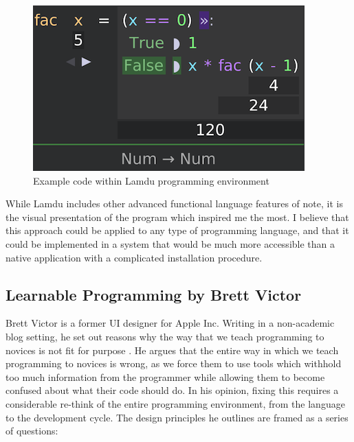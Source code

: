 \begin{figure}[H]
\centering
\includegraphics[scale=0.5]{graphics/lamdu} %
\caption{Example code within Lamdu programming environment}
\label{fig:scratch} %
\end{figure}

While Lamdu includes other advanced functional language features of note, it is the visual presentation of the program which inspired me the most. I believe that this approach could be applied to any type of programming language, and that it could be implemented in a system that would be much more accessible than a native application with a complicated installation procedure.

\subsection{Learnable Programming by Brett Victor}

Brett Victor is a former UI designer for Apple Inc. Writing in a non-academic blog setting, he set out reasons why the way that we teach programming to novices is not fit for purpose \cite{BrettVictor}. He argues that the entire way in which we teach programming to novices is wrong, as we force them to use tools which withhold too much information from the programmer while allowing them to become confused about what their code should do. In his opinion, fixing this requires a considerable re-think of the entire programming environment, from the language to the development cycle. The design principles he outlines are framed as a series of questions:

